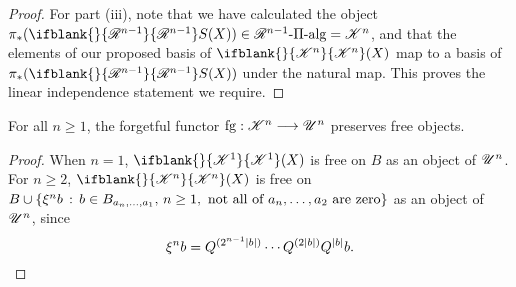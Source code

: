 \documentclass[11pt]{article}
\newcommand{\RestLie}[1]{\mathsf{r}{\scrL}^{#1}}%
\newcommand{\PRLie}[1]{\scrR^{#1}}%
\newcommand{\LL}[1]{{\scrK}^{#1}}%
\newcommand{\GR}[1]{\scrV^{#1}}%
\newcommand{\nontop}[1]{\scrU^{#1}}%
\newcommand{\PiAlg}[1]{#1\textup{-$\Pi$-alg}}
\newcommand{\admis}[1]{\mathrm{adm}(#1)}%
\newcommand{\iteratedrestn}[2]{\xi^{#2}{#1}}
\newcommand{\forget}{\mathrm{fg}}
\newcommand{\Fr}[2][]{\ifblank{#1}{#2}{#2_{#1}}}
\renewcommand{\Q}{Q}
\begin{document}
\begin{CategoriesOfInterest}
\begin{proof}
For part (iii), note that we have calculated the object $\pi_*(\Fr{\PRLie{n-1}}S(X))\in\PiAlg{\PRLie{n-1}}=\LL{n}$, and that the elements of our proposed basis of $\Fr{\LL{n}}(X)$ map to a basis of $\pi_*(\Fr{\PRLie{n-1}}S(X))$ under the natural map. This proves the linear independence statement we require.
%
\end{proof}
\begin{cor*}
For all $n\geq 1$, the forgetful functor $\forget:\LL{n}\to\nontop{n}$ preserves free objects.
\end{cor*}
\begin{proof}
When $n=1$, $\Fr{\LL{1}}(X)$ is free on $B$ as an object of $\nontop{n}$. For $n\geq2$, $\Fr{\LL{n}}(X)$  is free on $B\cup \{\iteratedrestn{b}{n}\,:\,b\in B_{a_{n},\ldots,a_1},\,n\geq1,\textup{ not all of $a_n,\ldots,a_2$ are zero}\}$ as an object of $\nontop{n}$, since
\[\iteratedrestn{b}{n}=\Q^{(2^{n-1}|b|)}\cdots \Q^{(2|b|)}\Q^{|b|}b.\qedhere\]
\end{proof}
\end{CategoriesOfInterest}
\end{document}
